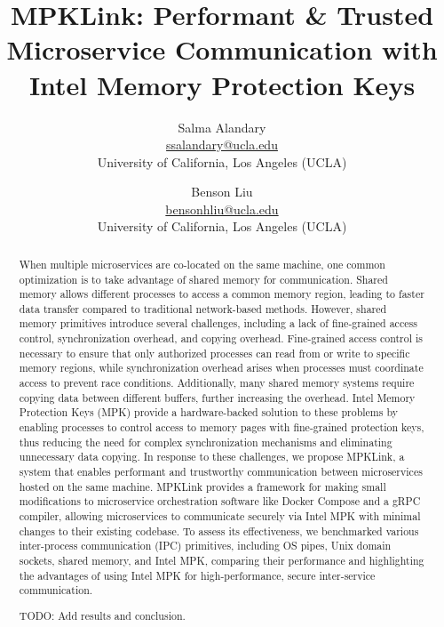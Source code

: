 \documentclass[letterpaper,twocolumn,10pt]{article}
\begin{document}

\date{}

\title{\Large \bf MPKLink: Performant \& Trusted Microservice Communication with Intel Memory Protection Keys}

\author{
{\rm Salma Alandary}\\
\url{ssalandary@ucla.edu}\\
University of California, Los Angeles (UCLA)
\and
{\rm Benson Liu}\\
\url{bensonhliu@ucla.edu}\\
University of California, Los Angeles (UCLA)
} %

\maketitle

\begin{abstract}
When multiple microservices are co-located on the same machine, one common optimization is to take advantage of shared memory for communication.
Shared memory allows different processes to access a common memory region, leading to faster data transfer compared to traditional network-based methods.
However, shared memory primitives introduce several challenges, including a lack of fine-grained access control, synchronization overhead, and copying overhead.
Fine-grained access control is necessary to ensure that only authorized processes can read from or write to specific memory regions, while synchronization overhead arises when processes must coordinate access to prevent race conditions.
Additionally, many shared memory systems require copying data between different buffers, further increasing the overhead.
Intel Memory Protection Keys (MPK) provide a hardware-backed solution to these problems by enabling processes to control access to memory pages with fine-grained protection keys, thus reducing the need for complex synchronization mechanisms and eliminating unnecessary data copying.
In response to these challenges, we propose MPKLink, a system that enables performant and trustworthy communication between microservices hosted on the same machine.
MPKLink provides a framework for making small modifications to microservice orchestration software like Docker Compose and a gRPC compiler, allowing microservices to communicate securely via Intel MPK with minimal changes to their existing codebase.
To assess its effectiveness, we benchmarked various inter-process communication (IPC) primitives, including OS pipes, Unix domain sockets, shared memory, and Intel MPK, comparing their performance and highlighting the advantages of using Intel MPK for high-performance, secure inter-service communication.

TODO: Add results and conclusion.
\end{abstract}
\end{document}
